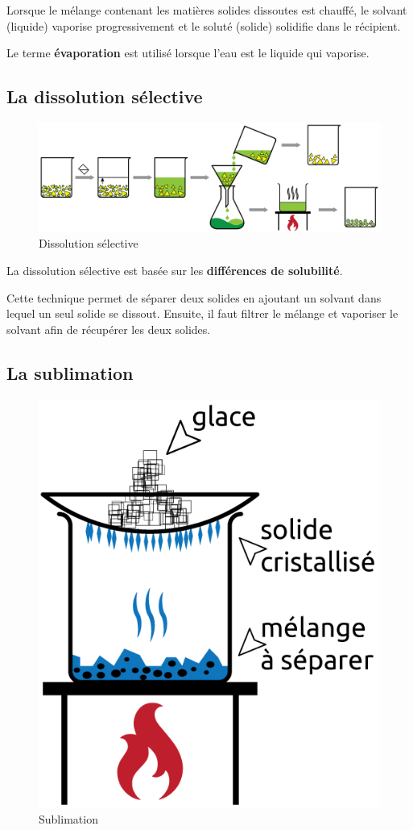 \documentclass[
  11pt,
  a4paper,
  openany]{book}
\begin{document}
Lorsque le mélange contenant les matières solides dissoutes est chauffé, le solvant (liquide) vaporise progressivement et le soluté (solide) solidifie dans le récipient.

Le terme \textbf{évaporation} est utilisé lorsque l'eau est le liquide qui vaporise.

\hypertarget{la-dissolution-suxe9lective}{%
\subsection{La dissolution sélective}\label{la-dissolution-suxe9lective}}


\begin{figure}

{\centering \includegraphics[width=0.85\linewidth]{images/dissolution-selective} 

}

\caption{Dissolution sélective}\label{fig:dissolution-selective}
\end{figure}


La dissolution sélective est basée sur les \textbf{différences de solubilité}.

Cette technique permet de séparer deux solides en ajoutant un solvant dans lequel un seul solide se dissout. Ensuite, il faut filtrer le mélange et vaporiser le solvant afin de récupérer les deux solides.

\newpage

\hypertarget{la-sublimation}{%
\subsection{La sublimation}\label{la-sublimation}}

\begin{figure}

{\centering \includegraphics[width=0.28\linewidth]{images/sublimation} 

}

\caption{Sublimation}\label{fig:sublimation}
\end{figure}
\end{document}
